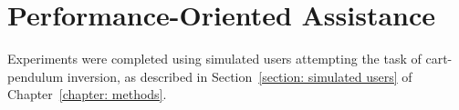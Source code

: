 %    
%   



\section{Performance-Oriented Assistance}

Experiments were completed using simulated users attempting the task of cart-pendulum inversion, as described in Section~\ref{section: simulated users} of Chapter~\ref{chapter: methods}. 

